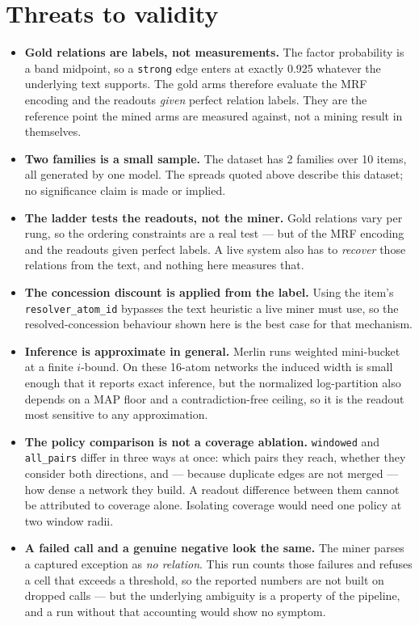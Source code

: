 \documentclass[11pt]{article}
\begin{document}
\section{Threats to validity}

\begin{itemize}
\item \textbf{Gold relations are labels, not measurements.} The factor probability is a band midpoint, so a \texttt{strong} edge enters at exactly 0.925 whatever the underlying text supports. The gold arms therefore evaluate the MRF encoding and the readouts \emph{given} perfect relation labels. They are the reference point the mined arms are measured against, not a mining result in themselves.
\item \textbf{Two families is a small sample.} The dataset has 2 families over 10 items, all generated by one model. The spreads quoted above describe this dataset; no significance claim is made or implied.
\item \textbf{The ladder tests the readouts, not the miner.} Gold relations vary per rung, so the ordering constraints are a real test --- but of the MRF encoding and the readouts given perfect labels. A live system also has to \emph{recover} those relations from the text, and nothing here measures that.
\item \textbf{The concession discount is applied from the label.} Using the item's \texttt{resolver\_atom\_id} bypasses the text heuristic a live miner must use, so the resolved-concession behaviour shown here is the best case for that mechanism.
\item \textbf{Inference is approximate in general.} Merlin runs weighted mini-bucket at a finite $i$-bound. On these 16-atom networks the induced width is small enough that it reports exact inference, but the normalized log-partition also depends on a MAP floor and a contradiction-free ceiling, so it is the readout most sensitive to any approximation.
\item \textbf{The policy comparison is not a coverage ablation.} \texttt{windowed} and \texttt{all\_pairs} differ in three ways at once: which pairs they reach, whether they consider both directions, and --- because duplicate edges are not merged --- how dense a network they build. A readout difference between them cannot be attributed to coverage alone. Isolating coverage would need one policy at two window radii.
\item \textbf{A failed call and a genuine negative look the same.} The miner parses a captured exception as \emph{no relation}. This run counts those failures and refuses a cell that exceeds a threshold, so the reported numbers are not built on dropped calls --- but the underlying ambiguity is a property of the pipeline, and a run without that accounting would show no symptom.

\end{itemize}
\end{document}
